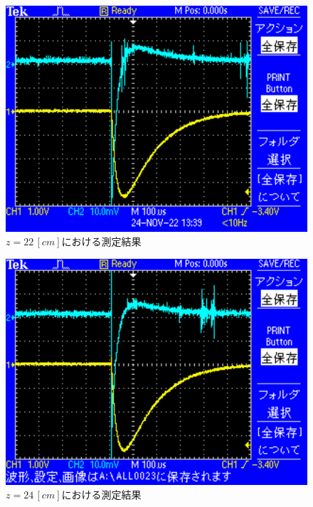 \begin{figure}[H]
    \centering
    \includegraphics[scale=0.5]{images-12.pdf}
    \caption{$z=22\,[cm]$における測定結果}
\end{figure}

\begin{figure}[H]
    \centering
    \includegraphics[scale=0.5]{images-13.pdf}
    \caption{$z=24\,[cm]$における測定結果}
\end{figure}

